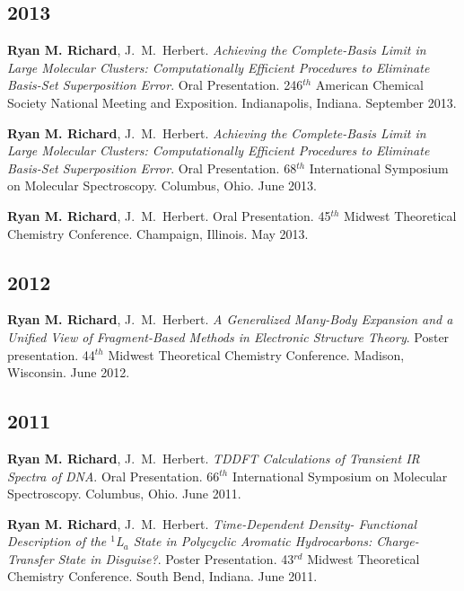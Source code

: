 \documentclass[11pt,a4paper,sans]{moderncv}
\begin{document}
\begin{etaremune}
	\subsection{2013}
	\item{\textbf{Ryan M. Richard}, J.~M.~Herbert.  {\em Achieving the 
		  Complete-Basis Limit in Large Molecular Clusters: Computationally 
		  Efficient Procedures to Eliminate Basis-Set Superposition Error}.  
		  Oral Presentation.  246$^{th}$ American Chemical Society National 
		  Meeting and Exposition.  Indianapolis, Indiana.  September 2013.}
	\item{\textbf{Ryan M. Richard}, J.~M.~Herbert.  {\em Achieving the 
	      Complete-Basis Limit in Large Molecular Clusters: Computationally 
		  Efficient Procedures to Eliminate Basis-Set Superposition Error}.  
		  Oral Presentation.  68$^{th}$ International Symposium on Molecular 
		  Spectroscopy.  Columbus, Ohio. June 2013.}
	\item{\textbf{Ryan M. Richard}, J.~M.~Herbert. Oral Presentation. 
	      45$^{th}$ Midwest Theoretical Chemistry Conference.  Champaign, 
		  Illinois.  May 2013.}

	\subsection{2012}
		\item{\textbf{Ryan M. Richard}, J.~M.~Herbert. {\em A Generalized 
		      Many-Body Expansion and a Unified View of Fragment-Based Methods 
			  in Electronic Structure Theory}.  Poster presentation.  
			  44$^{th}$ Midwest Theoretical Chemistry Conference.  Madison, 
			  Wisconsin.  June 2012.}

	\subsection{2011}
	\item{\textbf{Ryan M. Richard}, J.~M.~Herbert.  {\em TDDFT Calculations of
	Transient IR Spectra of DNA}.  Oral Presentation.  66$^{th}$ International
	Symposium on Molecular Spectroscopy.  Columbus, Ohio.  June 2011.}
	\item{\textbf{Ryan M. Richard}, J.~M.~Herbert.  {\em Time-Dependent Density-
	      Functional Description of the $^1$L$_a$ State in Polycyclic Aromatic 
		  Hydrocarbons: Charge-Transfer State in Disguise?}.  Poster 
		  Presentation. 43$^{rd}$ Midwest Theoretical Chemistry Conference. 
		  South Bend, Indiana. June 2011.}
	

\end{etaremune}
\end{document}
